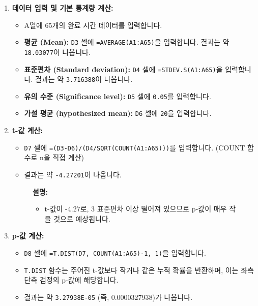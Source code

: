 \documentclass[11pt,a4paper]{article}
\theoremstyle{definition}
\begin{document}
\begin{enumerate}
    \item \textbf{데이터 입력 및 기본 통계량 계산:}
    \begin{itemize}
        \item A열에 65개의 완료 시간 데이터를 입력합니다.
        \item \textbf{평균 (Mean):} \texttt{D3} 셀에 \texttt{=AVERAGE(A1:A65)}을 입력합니다. 결과는 약 \texttt{18.03077}이 나옵니다.
        \item \textbf{표준편차 (Standard deviation):} \texttt{D4} 셀에 \texttt{=STDEV.S(A1:A65)}을 입력합니다. 결과는 약 \texttt{3.716388}이 나옵니다.
        \item \textbf{유의 수준 (Significance level):} \texttt{D5} 셀에 \texttt{0.05}를 입력합니다.
        \item \textbf{가설 평균 (hypothesized mean):} \texttt{D6} 셀에 \texttt{20}을 입력합니다.
    \end{itemize}

    \item \textbf{t-값 계산:}
    \begin{itemize}
        \item \texttt{D7} 셀에 \texttt{=(D3-D6)/(D4/SQRT(COUNT(A1:A65)))}를 입력합니다. (COUNT 함수로 n을 직접 계산)
        \item 결과는 약 \texttt{-4.27201}이 나옵니다.
    \end{itemize}
    \begin{figure}[h!]
        \centering
        \label{fig:excel_survey_t_value}
        \vspace{0.5em}
        \textbf{설명:}
        \begin{itemize}
            \item t-값이 -4.27로, 3 표준편차 이상 떨어져 있으므로 p-값이 매우 작을 것으로 예상됩니다.
        \end{itemize}
    \end{figure}

    \item \textbf{p-값 계산:}
    \begin{itemize}
        \item \texttt{D8} 셀에 \texttt{=T.DIST(D7, COUNT(A1:A65)-1, 1)}을 입력합니다.
        \item \texttt{T.DIST} 함수는 주어진 t-값보다 작거나 같은 누적 확률을 반환하며, 이는 좌측 단측 검정의 p-값에 해당합니다.
        \item 결과는 약 \texttt{3.27938E-05} (즉, 0.0000327938)가 나옵니다.
    \end{itemize}


\end{enumerate}
\end{document}
